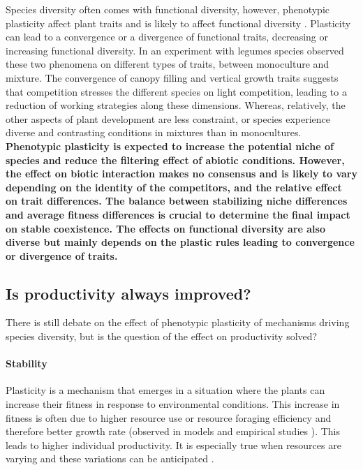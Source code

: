 Species diversity often comes with functional diversity, however, phenotypic plasticity affect plant traits and is likely to affect functional diversity \parencite{albert_importance_2012}. Plasticity can lead to a convergence or a divergence of functional traits, decreasing or increasing functional diversity. In an experiment with legumes species \citet{roscher_contrasting_2015} observed these two phenomena on different types of traits, between monoculture and mixture. The convergence of canopy filling and vertical growth traits suggests that competition stresses the different species on light competition, leading to a reduction of working strategies along these dimensions. Whereas, relatively, the other aspects of plant development are less constraint, or species experience diverse and contrasting conditions in mixtures than in monocultures.\\




\textbf{Phenotypic plasticity is expected to increase the potential niche of species and reduce the filtering effect of abiotic conditions. However, the effect on biotic interaction makes no consensus and is likely to vary depending on the identity of the competitors, and the relative effect on trait differences. The balance between stabilizing niche differences and average fitness differences is crucial to determine the final impact on stable coexistence. The effects on functional diversity are also diverse but mainly depends on the plastic rules leading to convergence or divergence of traits.}


\subsection{Is productivity always improved?}

There is still debate on the effect of phenotypic plasticity of mechanisms driving species diversity, but is the question of the effect on productivity solved?

\paragraph{Stability}

Plasticity is a mechanism that emerges in a situation where the plants can increase their fitness in response to environmental conditions. This increase in fitness is often due to higher resource use or resource foraging efficiency and therefore better growth rate (observed in models \parencite{maire_plasticity_2013} and empirical studies \parencite{ hamann_evidence_2016}). This leads to higher individual productivity. It is especially true when resources are varying and these variations can be anticipated  \parencite{richter_phenotypic_2012}.

